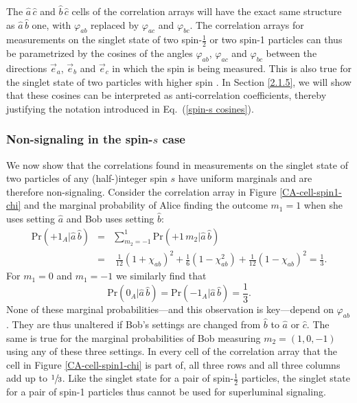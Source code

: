 The $\hat{a} \, \hat{c}$ and $\hat{b} \, \hat{c}$ cells of the correlation arrays will have the exact same structure as $\hat{a} \, \hat{b}$ one, with $\varphi_{ab}$ replaced by $\varphi_{ac}$ and $\varphi_{bc}$. The correlation arrays for measurements on the singlet state of two spin-$\frac12$ or two spin-1 particles can thus be parametrized by the cosines of the angles $\varphi_{ab}$, $\varphi_{ac}$ and $\varphi_{bc}$ between the directions $\vec{e}_a$, $\vec{e}_b$ and $\vec{e}_c$ in which the spin is being measured. This is also true for the singlet state of two particles with higher spin \citep[Vol.\ 2, p.\ 1072, Eq.\ (3.72)]{Messiah 1962}. In Section \ref{2.1.5}, we will show that these cosines can be interpreted as anti-correlation coefficients, thereby justifying the notation introduced in Eq.\ (\ref{spin-s cosines}). 

  
\subsubsection{Non-signaling in the spin-$s$ case} \label{2.1.4}

We now show that the correlations found in measurements on the singlet state of two particles of any (half-)integer spin $s$ have uniform marginals and are therefore non-signaling. Consider the correlation array in Figure \ref{CA-cell-spin1-chi} and the marginal probability of Alice finding the outcome $m_1 = 1$ when she uses setting $\hat{a}$ and Bob uses setting $\hat{b}$:
\begin{eqnarray} 
\mathrm{Pr}(+1_A| \hat{a}\, \hat{b}) \nonumber
& \!\!\! = \!\!\! &\sum_{m_2=-1}^1 \mathrm{Pr}(+1\,m_2| \hat{a}\, \hat{b}) \nonumber \\[.3 cm]
&\!\!\! = \!\!\!  &\; \frac{1}{12}(1+ \chi_{ab})^2+\frac{1}{6}(1- \chi_{ab}^2)+\frac{1}{12}(1- \chi_{ab})^2 = \frac13.
\label{nonsignal 1}
\end{eqnarray}
For $m_1=0$ and $m_1 = -1$ we similarly find that 
\begin{equation}
\mathrm{Pr}(0_A| \hat{a}\, \hat{b})=\mathrm{Pr}(-1_A| \hat{a}\, \hat{b})= \frac13.
\end{equation}
None of these marginal probabilities---and this observation is key---depend on $\varphi_{ab}$. They are thus unaltered if Bob's settings are changed from $\hat{b}$ to $\hat{a}$ or $\hat{c}$. The same is true for the marginal probabilities of Bob measuring $m_2 = (1, 0, -1)$ using any of these three settings. In every cell of the correlation array that the cell in  Figure \ref{CA-cell-spin1-chi} is part of, all three rows and all three columns add up to $\sfrac13$. Like the singlet state for a pair of spin-$\frac12$ particles, the singlet state for a pair of spin-1 particles thus cannot be used for superluminal signaling.

